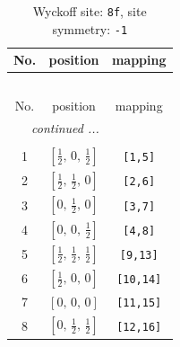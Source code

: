 \documentclass[fleqn,8pt]{jsarticle}
\begin{document}
\begin{longtable}{ccc}
\caption{Wyckoff site: {\tt 8f}, site symmetry: {\tt -1}}
 \\
 \hline \hline
No. & position & mapping \\ \hline \endfirsthead

\multicolumn{2}{l}{\tablename\ \thetable{}} \\
 \hline \hline
No. & position & mapping \\ \hline \endhead

 \hline \hline
\multicolumn{2}{r}{\footnotesize\it continued ...} \\ \endfoot

 \hline \hline
\multicolumn{2}{r}{} \\ \endlastfoot

1 & $\left[ \frac{1}{2},\, 0,\, \frac{1}{2} \right]$ & {\tt [1,5]} \\ \hline
2 & $\left[ \frac{1}{2},\, \frac{1}{2},\, 0 \right]$ & {\tt [2,6]} \\ \hline
3 & $\left[ 0,\, \frac{1}{2},\, 0 \right]$ & {\tt [3,7]} \\ \hline
4 & $\left[ 0,\, 0,\, \frac{1}{2} \right]$ & {\tt [4,8]} \\ \hline
5 & $\left[ \frac{1}{2},\, \frac{1}{2},\, \frac{1}{2} \right]$ & {\tt [9,13]} \\ \hline
6 & $\left[ \frac{1}{2},\, 0,\, 0 \right]$ & {\tt [10,14]} \\ \hline
7 & $\left[ 0,\, 0,\, 0 \right]$ & {\tt [11,15]} \\ \hline
8 & $\left[ 0,\, \frac{1}{2},\, \frac{1}{2} \right]$ & {\tt [12,16]} \\
\end{longtable}
\renewcommand{\arraystretch}{1.2}
\end{document}

